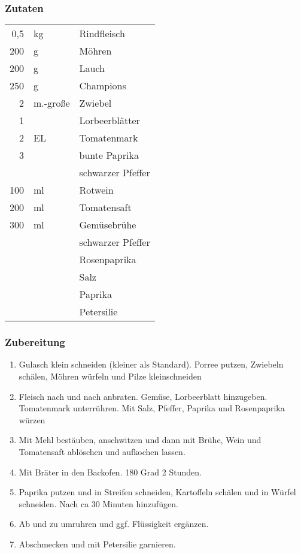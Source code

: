 \subsubsection*{Zutaten}
\begin{tabular}{rll}
	0,5 & kg       & Rindfleisch       \\
	200 & g        & Möhren            \\
	200 & g        & Lauch             \\
	250 & g        & Champions         \\
	  2 & m.-große & Zwiebel           \\
	  1 &          & Lorbeerblätter    \\
	  2 & EL       & Tomatenmark       \\
	  3 &          & bunte Paprika     \\
	    &          & schwarzer Pfeffer \\
	100 & ml       & Rotwein           \\
	200 & ml       & Tomatensaft       \\
	300 & ml       & Gemüsebrühe       \\
	    &          & schwarzer Pfeffer \\
	    &          & Rosenpaprika \\
	    &          & Salz \\
	    &          & Paprika\\
	   &        & Petersilie
\end{tabular} 

\subsubsection*{Zubereitung}
\begin{enumerate}
	\item Gulasch klein schneiden (kleiner als Standard). Porree putzen, Zwiebeln schälen,  Möhren würfeln und Pilze kleinschneiden
	\item Fleisch nach und nach anbraten. Gemüse, Lorbeerblatt hinzugeben. Tomatenmark unterrühren. Mit Salz, Pfeffer, Paprika und Rosenpaprika würzen
	\item Mit Mehl bestäuben, anschwitzen und dann mit Brühe, Wein und Tomatensaft ablöschen und aufkochen lassen.
	\item Mit Bräter in den Backofen. 180 Grad 2 Stunden.
	\item Paprika putzen und in Streifen schneiden, Kartoffeln schälen und in Würfel schneiden. Nach ca 30 Minuten hinzufügen.
	\item Ab und zu umruhren und ggf. Flüssigkeit ergänzen.
	\item Abschmecken und mit Petersilie garnieren.
\end{enumerate}




